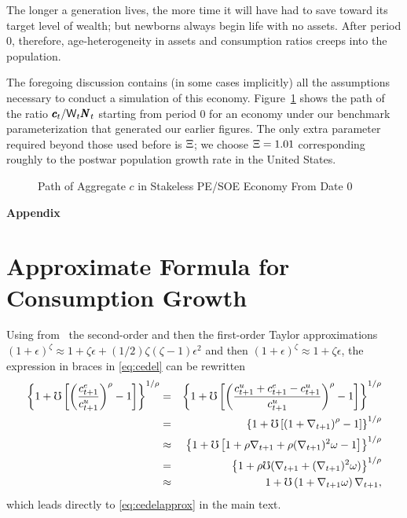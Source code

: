 \message{ !name(TractableBufferStock.tex)}\documentclass{handout}
\begin{document}
The longer a generation lives, the more time it will have had to save toward
its target level of wealth; but newborns always begin life with no assets.  After period 0, therefore, age-heterogeneity in assets and consumption ratios creeps into the population.

The foregoing discussion contains (in some cases implicitly) all the
assumptions necessary to conduct a simulation of this economy.
Figure~\ref{fig:SOENoStakescPath} shows the path of the ratio $\pmb{c}_{t}/\mathsf{W}_{t}\pmb{N}_{t}$ starting from
period 0 for an economy under our benchmark parameterization that generated
our earlier figures.  The
only extra parameter required beyond those used before is $\Xi$; we choose $\Xi=1.01$ corresponding
roughly to the postwar population growth rate in the United States.

\begin{figure}
\caption{Path of Aggregate $c$ in Stakeless PE/SOE Economy From Date 0}
\label{fig:SOENoStakescPath}
\end{figure}




\pagebreak\appendix
\centerline{\bf \LARGE Appendix}\medskip

\setcounter{section}{0}

\section{Approximate Formula for Consumption Growth}\label{sec:CGroApprox}

Using from \MathFactsList ~the second-order and then the first-order
Taylor approximations  \TaylorTwo $(1+\epsilon)^{\zeta} \approx 1 + \zeta \epsilon +
(1/2)\zeta(\zeta-1) \epsilon^{2}$ and then \TaylorOne $(1+\epsilon)^{\zeta} \approx 1 + \zeta \epsilon$, the expression in braces
in \eqref{eq:cedel} can be rewritten
\begin{eqnarray}
        \left\{1+\mho\left[\left(\frac{c^{e}_{t+1}}{c^{u}_{t+1}}\right)^{\rho}-1\right]\right\}^{1/\rho} & = & \left\{1+\mho\left[\left(\frac{c^{u}_{t+1}+c^{e}_{t+1}-c^{u}_{t+1}}{c^{u}_{t+1}}\right)^{\rho}-1\right]\right\}^{1/\rho} \notag
\\      & = & \left\{1+\mho\left[\left(1+\nabla _{t+1}\right)^{\rho}-1\right]\right\}^{1/\rho} \notag
\\      & \approx &      \left\{1+\mho\left[1+\rho \nabla _{t+1}+ \rho (\nabla _{t+1})^{2}\omega-1\right]\right\}^{1/\rho} \notag 
\\ & = &         \left\{1+ \rho \mho (\nabla _{t+1}+ (\nabla _{t+1})^{2}\omega)\right\}^{1/\rho} \notag
\\ & \approx & 1+ \mho  \left(1+\nabla _{t+1}\omega\right)\nabla _{t+1}, \notag
\end{eqnarray}
which leads directly to \eqref{eq:cedelapprox} in the main text.
\end{document}
